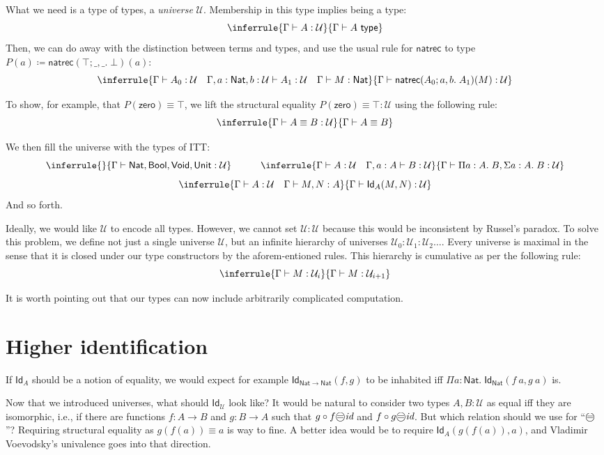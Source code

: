 \documentclass{article} \usepackage{chtt-notes} \usepackage{stmaryrd}
\newcommand{\entails}{\vdash}
\newcommand{\G}{\Gamma}
\newcommand{\atype}[1]{#1~\mathsf{type}}
\newcommand{\Nat}{\mathsf{Nat}}
\newcommand{\circled}[1]{\text{\textcircled{#1}}}
\begin{document}
What we need is a type of types, a \emph{universe} $\mathcal{U}$.
Membership in this type implies being a type:
\[ \inferrule{\G \entails A : \mathcal{U}}{\G \entails \atype{A}} \]
Then, we can do away with the distinction between terms and types, and use the usual rule for $\textsf{natrec}$ to type $P(a) \coloneqq \textsf{natrec}(\top; \_, \_. \; \bot)(a)$:
\[ \inferrule{\G \entails A_0 : \mathcal{U} \quad \G, a : \Nat, b : \mathcal{U} \entails A_1 : \mathcal{U} \quad \G \entails M : \Nat}{\G \entails \textsf{natrec}(A_0; a, b.\; A_1)(M) : \mathcal{U}} \]

To show, for example, that $P(\textsf{zero}) \equiv \top$, we lift the structural equality $P(\textsf{zero}) \equiv \top : \mathcal{U}$ using the following rule:
\[ \inferrule{\G \entails A \equiv B : \mathcal{U}}{\G \entails A \equiv B} \]

We then fill the universe with the types of ITT:
\[ \inferrule{}{\G \entails \Nat, \textsf{Bool}, \textsf{Void}, \textsf{Unit} : \mathcal{U}} \quad \quad \quad \inferrule{\G \entails A : \mathcal{U} \quad \G, a: A \entails B : \mathcal{U}}{\G \entails \Pi a : A.\; B, \Sigma a : A.\; B : \mathcal{U}}\]
\[ \inferrule{\G \entails A : \mathcal{U} \quad \G \entails M, N : A}{\G \entails \textsf{Id}_A(M, N) : \mathcal{U}} \]
And so forth.

Ideally, we would like $\mathcal{U}$ to encode all types.
However, we cannot set $\mathcal{U} : \mathcal{U}$ because this would be inconsistent by Russel's paradox.
To solve this problem, we define not just a single universe $\mathcal{U}$, but an infinite hierarchy of universes $\mathcal{U}_0: \mathcal{U}_1: \mathcal{U}_2 \dots$.
Every universe is maximal in the sense that it is closed under our type constructors by the aforem-entioned rules.
This hierarchy is cumulative as per the following rule:
\[ \inferrule{\G \entails M : \mathcal{U}_i}{\G \entails M : \mathcal{U}_{i + 1}}\]

It is worth pointing out that our types can now include arbitrarily complicated computation.

\section{Higher identification}
If $\textsf{Id}_A$ should be a notion of equality, we would expect for example $\textsf{Id}_{\Nat \to \Nat}(f, g)$ to be inhabited iff $\Pi a: \Nat.\; \textsf{Id}_{\Nat}(f~a, g~a)$ is.

Now that we introduced universes, what should $\textsf{Id}_{\mathcal{U}}$ look like?
It would be natural to consider two types $A, B : \mathcal{U}$ as equal iff they are isomorphic, i.e., if there are functions $f : A \to B$ and $g : B \to A$ such that $g \circ f \circled{=} \textit{id}$ and $f \circ g \circled{=} \textit{id}$.
But which relation should we use for ``$\circled{=}$''?
Requiring structural equality as $g(f(a)) \equiv a$ is way to fine.
A better idea would be to require $\textsf{Id}_A(g(f(a)), a)$, and Vladimir Voevodsky's univalence goes into that direction. \medskip
\end{document}
